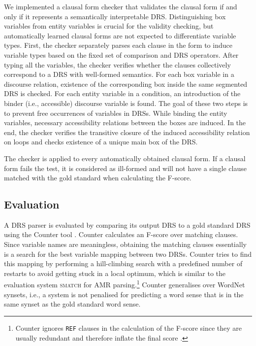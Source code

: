 \documentclass[11pt,a4paper]{article}
\begin{document}
We implemented a clausal form checker that validates the clausal form if and only if it represents a semantically interpretable DRS.
Distinguishing box variables from entity variables is crucial for the validity checking, but automatically learned clausal forms are not expected to differentiate variable types.
First, the checker separately parses each clause in the form to induce variable types based on the fixed set of comparison and DRS operators.
After typing all the variables, the checker verifies whether the clauses collectively correspond to a DRS with well-formed semantics. 
For each box variable in a discourse relation, existence of the corresponding box inside the same segmented DRS is checked.
For each entity variable in a condition, an introduction of the binder (i.e., accessible) discourse variable is found.
The goal of these two steps is to prevent free occurrences of variables in DRSs.   
While binding the entity variables, necessary accessibility relations between the boxes are induced.
In the end, the checker verifies the transitive closure of the induced accessibility relation on loops and checks existence of a unique main box of the DRS.  

The checker is applied to every automatically obtained clausal form.
If a clausal form fails the test, it is considered as ill-formed and will not have a single clause matched with the gold standard when calculating the F-score.

\subsection{Evaluation}
\label{ssec:evaluation}

A DRS parser is evaluated by comparing its output DRS to a gold standard DRS using the Counter tool \cite{pmb-LREC:18}. Counter calculates an F-score over matching clauses. Since variable names are meaningless, obtaining the matching clauses essentially is a search for the best variable mapping between two DRSs. Counter tries to find this mapping by performing a hill-climbing search with a predefined number of restarts to avoid getting stuck in a local optimum, which is similar to the evaluation system \textsc{smatch} \cite{smatch:13} for AMR parsing.\footnote{Counter ignores \texttt{REF} clauses in the calculation of the F-score since they are usually redundant and therefore inflate the final score \cite{pmb-LREC:18}.} 
Counter generalises over WordNet synsets, i.e., a system is not penalised for predicting a word sense that is in the same synset as the gold standard word sense. 
\end{document}
